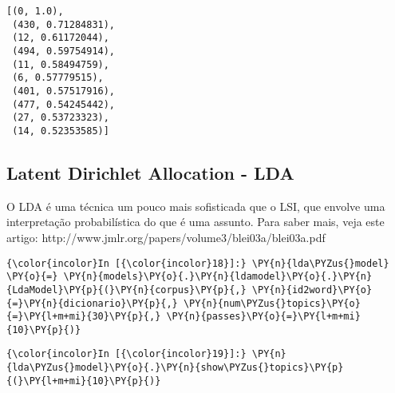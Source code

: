     \begin{Verbatim}[commandchars=\\\{\}]
[(0, 1.0),
 (430, 0.71284831),
 (12, 0.61172044),
 (494, 0.59754914),
 (11, 0.58494759),
 (6, 0.57779515),
 (401, 0.57517916),
 (477, 0.54245442),
 (27, 0.53723323),
 (14, 0.52353585)]

    \end{Verbatim}

    \subsection{Latent Dirichlet Allocation -
LDA}\label{latent-dirichlet-allocation---lda}

O LDA é uma técnica um pouco mais sofisticada que o LSI, que envolve uma
interpretação probabilística do que é uma assunto. Para saber mais, veja
este artigo: http://www.jmlr.org/papers/volume3/blei03a/blei03a.pdf

    \begin{Verbatim}[commandchars=\\\{\}]
{\color{incolor}In [{\color{incolor}18}]:} \PY{n}{lda\PYZus{}model} \PY{o}{=} \PY{n}{models}\PY{o}{.}\PY{n}{ldamodel}\PY{o}{.}\PY{n}{LdaModel}\PY{p}{(}\PY{n}{corpus}\PY{p}{,} \PY{n}{id2word}\PY{o}{=}\PY{n}{dicionario}\PY{p}{,} \PY{n}{num\PYZus{}topics}\PY{o}{=}\PY{l+m+mi}{30}\PY{p}{,} \PY{n}{passes}\PY{o}{=}\PY{l+m+mi}{10}\PY{p}{)}
\end{Verbatim}

    \begin{Verbatim}[commandchars=\\\{\}]
{\color{incolor}In [{\color{incolor}19}]:} \PY{n}{lda\PYZus{}model}\PY{o}{.}\PY{n}{show\PYZus{}topics}\PY{p}{(}\PY{l+m+mi}{10}\PY{p}{)}
\end{Verbatim}


